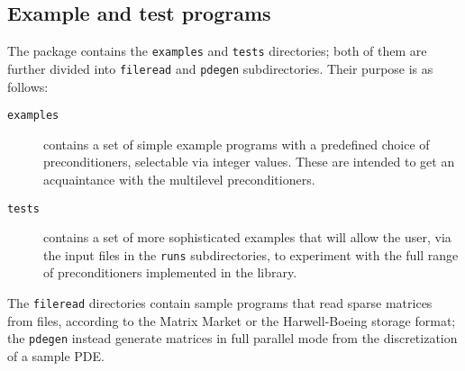 \subsection{Example and test programs\label{sec:ex_and_test}}
The package contains the \verb|examples| and \verb|tests| directories;
both of them are further divided into \verb|fileread| and
\verb|pdegen| subdirectories. Their purpose is as follows:
\begin{description}
\item[\tt examples] contains a set of simple example programs with a
  predefined choice of preconditioners, selectable via integer
  values. These are intended to get an acquaintance with the
  multilevel preconditioners.
\item[\tt tests] contains a set of more sophisticated examples that
  will allow the user, via the input files in the \verb|runs|
  subdirectories, to experiment with the full range of preconditioners
  implemented in the library.
\end{description}
The \verb|fileread| directories contain sample programs that read
sparse matrices from files, according to the Matrix Market or the
Harwell-Boeing storage format; the \verb|pdegen| instead generate
matrices in full parallel mode from the discretization of a sample PDE. 
